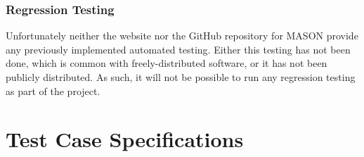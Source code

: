 \documentclass[11pt]{article}
\begin{document}
\subsubsection{Regression Testing}
Unfortunately neither the website nor the GitHub repository for MASON provide any previously implemented automated testing.
Either this testing has not been done, which is common with freely-distributed software, or it has not been publicly distributed.
As such, it will not be possible to run any regression testing as part of the project.

\section{Test Case Specifications}%
\end{document}

